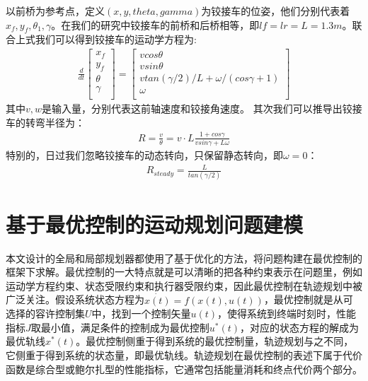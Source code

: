 \documentclass[master,academic]{ysuthesis} %
\begin{document}
	以前桥为参考点，定义$(x,y,theta,gamma)$为铰接车的位姿，他们分别代表着$x_f,y_f,\theta_1,\gamma$。在我们的研究中铰接车的前桥和后桥相等，即$lf=lr=L=1.3m$。联合上式我们可以得到铰接车的运动学方程为:
	\begin{equation}
		\begin{aligned}
			\frac{d}{dt}\left[ \begin{array}{c}
				x_f\\
				y_f\\
				\theta\\
				\gamma\\
			\end{array} \right] =\left[ \begin{array}{c}
				vcos\theta\\
				vsin\theta\\
				vtan( \gamma /2 ) /L+\omega /( cos\gamma +1 )\\
				\omega\\
			\end{array} \right] 
		\end{aligned}
	\end{equation}
	其中$v,w$是输入量，分别代表这前轴速度和铰接角速度。
	其次我们可以推导出铰接车的转弯半径为：
	\begin{equation}
		\begin{aligned}
			R = \frac{v}{\theta} = v\cdot L \frac{1+cos\gamma}{vsin\gamma+L\omega }
		\end{aligned}
	\end{equation}
	特别的，日过我们忽略铰接车的动态转向，只保留静态转向，即$\omega=0$：
	\begin{equation}
		\begin{aligned}
			R_{steady} = \frac{L}{tan(\gamma/2)} 
		\end{aligned}
	\end{equation}

		
		
	\section{基于最优控制的运动规划问题建模}
	本文设计的全局和局部规划器都使用了基于优化的方法，将问题构建在最优控制的框架下求解。最优控制的一大特点就是可以清晰的把各种约束表示在问题里，例如运动学方程约束、状态受限约束和执行器受限约束，因此最优控制在轨迹规划中被广泛关注。假设系统状态方程为$\dot{x(t)}=f(x(t),u(t))$，最优控制就是从可选择的容许控制集$U$中，找到一个控制矢量$u(t)$，使得系统到终端时刻时，性能指标$J$取最小值，满足条件的控制成为最优控制$u^{*}(t)$，对应的状态方程的解成为最优轨线$x^{*}(t)$。最优控制侧重于得到系统的最优控制量，轨迹规划与之不同，它侧重于得到系统的状态量，即最优轨线。轨迹规划在最优控制的表述下属于代价函数是综合型或鲍尔扎型的性能指标，它通常包括能量消耗和终点代价两个部分。
	
\end{document}
